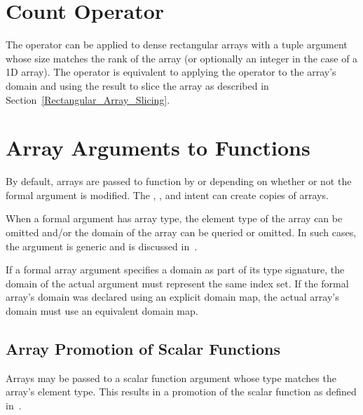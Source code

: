 \section{Count Operator}
\label{Count_Operator_Arrays}
The \chpl{#} operator can be applied to dense rectangular arrays with
a tuple argument whose size matches the rank of the array (or
optionally an integer in the case of a 1D array).  The operator is
equivalent to applying the \chpl{#} operator to the array's domain and
using the result to slice the array as described in
Section~\ref{Rectangular_Array_Slicing}.


\section{Array Arguments to Functions}
\label{Array_Arguments_To_Functions}

By default, arrays are passed to function by  or  depending on whether or not the formal argument is modified. The
, , and  intent can create copies of
arrays.

When a formal argument has array type, the element type of the array
can be omitted and/or the domain of the array can be queried or
omitted.  In such cases, the argument is generic and is discussed
in~.

If a formal array argument specifies a domain as part of its type
signature, the domain of the actual argument must represent the same
index set.  If the formal array's domain was declared using an
explicit domain map, the actual array's domain must use an equivalent
domain map.

\subsection{Array Promotion of Scalar Functions}
\label{Array_Promotion_of_Scalar_Functions}

Arrays may be passed to a scalar function argument whose type
matches the array's element type.  This results in a promotion of the
scalar function as defined in~.

